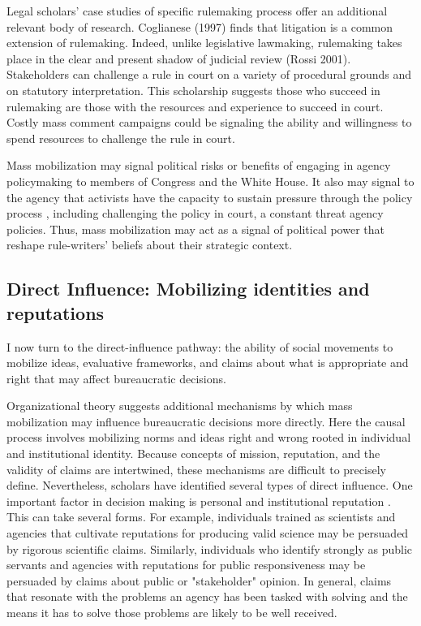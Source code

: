 Legal scholars' case studies of specific rulemaking process offer an additional relevant body of research. Coglianese (1997) finds that litigation is a common extension of rulemaking. Indeed, unlike legislative lawmaking, rulemaking takes place in the clear and present shadow of judicial review (Rossi 2001). Stakeholders can challenge a rule in court on a variety of procedural grounds and on statutory interpretation. This scholarship suggests those who succeed in rulemaking are those with the resources and experience to succeed in court. Costly mass comment campaigns could be signaling the ability and willingness to spend resources to challenge the rule in court. 

Mass mobilization may signal political risks or benefits of engaging in agency policymaking to members of Congress and the White House. It also may signal to the agency that activists have the capacity to sustain pressure through the policy process \citep{Coglianese2001}, including challenging the policy in court, a constant threat agency policies. Thus, mass mobilization may act as a signal of political power that  reshape rule-writers' beliefs about their strategic context. 



\subsection{Direct Influence: Mobilizing identities and reputations}

I now turn to the direct-influence pathway: the ability of social movements to mobilize ideas, evaluative frameworks, and claims about what is appropriate and right that may affect bureaucratic decisions. %

Organizational theory suggests additional mechanisms by which mass mobilization may influence bureaucratic decisions more directly. Here the causal process involves mobilizing norms and ideas right and wrong rooted in individual and institutional identity. Because concepts of mission, reputation, and the validity of claims are intertwined, these mechanisms are difficult to precisely define. Nevertheless, scholars have identified several types of direct influence. One important factor in decision making is personal and institutional reputation \citep{Carpenter2001}. This can take several forms. For example, individuals trained as scientists and agencies that cultivate reputations for producing valid science may be persuaded by rigorous scientific claims. Similarly, individuals who identify strongly as public servants and agencies with reputations for public responsiveness may be persuaded by claims about public or "stakeholder" opinion. In general, claims that resonate with the problems an agency has been tasked with solving and the means it has to solve those problems are likely to be well received.  

